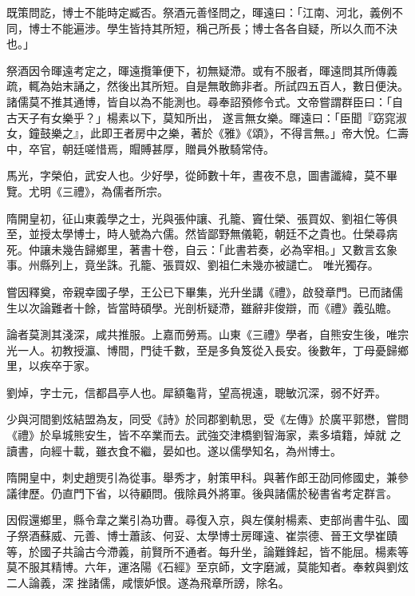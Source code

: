 \begin{pinyinscope}
 既策問訖，博士不能時定臧否。祭酒元善怪問之，暉遠曰：「江南、河北，義例不同，博士不能遍涉。學生皆持其所短，稱己所長；博士各各自疑，所以久而不決也。」



 祭酒因令暉遠考定之，暉遠攬筆便下，初無疑滯。或有不服者，暉遠問其所傳義疏，輒為始末誦之，然後出其所短。自是無敢飾非者。所試四五百人，數日便決。諸儒莫不推其通博，皆自以為不能測也。尋奉詔預修令式。文帝嘗謂群臣曰：「自古天子有女樂乎？」楊素以下，莫知所出，
 遂言無女樂。暉遠曰：「臣聞『窈窕淑女，鐘鼓樂之』，此即王者房中之樂，著於《雅》《頌》，不得言無。」帝大悅。仁壽中，卒官，朝廷嗟惜焉，賵賻甚厚，贈員外散騎常侍。



 馬光，字榮伯，武安人也。少好學，從師數十年，晝夜不息，圖書讖緯，莫不畢覽。尤明《三禮》，為儒者所宗。



 隋開皇初，征山東義學之士，光與張仲讓、孔籠、竇仕榮、張買奴、劉祖仁等俱至，並授太學博士，時人號為六儒。然皆鄙野無儀範，朝廷不之貴也。仕榮尋病死。仲讓未幾告歸鄉里，著書十卷，自云：「此書若奏，必為宰相。」又數言玄象事。州縣列上，竟坐誅。孔籠、張買奴、劉祖仁未幾亦被譴亡。
 唯光獨存。



 嘗因釋奠，帝親幸國子學，王公已下畢集，光升坐講《禮》，啟發章門。已而諸儒生以次論難者十餘，皆當時碩學。光剖析疑滯，雖辭非俊辯，而《禮》義弘贍。



 論者莫測其淺深，咸共推服。上嘉而勞焉。山東《三禮》學者，自熊安生後，唯宗光一人。初教授瀛、博間，門徒千數，至是多負笈從入長安。後數年，丁母憂歸鄉里，以疾卒于家。



 劉焯，字士元，信都昌亭人也。犀額龜背，望高視遠，聰敏沉深，弱不好弄。



 少與河間劉炫結盟為友，同受《詩》於同郡劉軌思，受《左傳》於廣平郭懋，嘗問《禮》於阜城熊安生，皆不卒業而去。武強交津橋劉智海家，素多墳籍，焯就
 之讀書，向經十載，雖衣食不繼，晏如也。遂以儒學知名，為州博士。



 隋開皇中，刺史趙煚引為從事。舉秀才，射策甲科。與著作郎王劭同修國史，兼參議律歷。仍直門下省，以待顧問。俄除員外將軍。後與諸儒於秘書省考定群言。



 因假還鄉里，縣令韋之業引為功曹。尋復入京，與左僕射楊素、吏部尚書牛弘、國子祭酒蘇威、元善、博士蕭該、何妥、太學博士房暉遠、崔崇德、晉王文學崔賾等，於國子共論古今滯義，前賢所不通者。每升坐，論難鋒起，皆不能屈。楊素等莫不服其精博。六年，運洛陽《石經》至京師，文字磨滅，莫能知者。奉敕與劉炫二人論義，深
 挫諸儒，咸懷妒恨。遂為飛章所謗，除名。




\end{pinyinscope}
